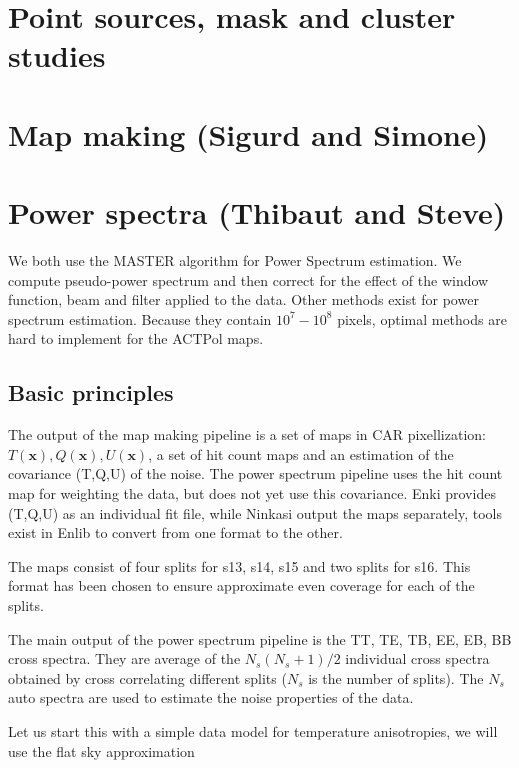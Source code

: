 \documentclass[a4paper, 11pt]{article}
\begin{document}
\section{Point sources, mask and cluster studies}


\section{Map making (Sigurd and Simone)}

\section{Power spectra (Thibaut and Steve)}

We both use the MASTER algorithm for Power Spectrum estimation. We compute pseudo-power spectrum and then correct for the effect of the window function, beam and filter applied to the data. Other methods exist for power spectrum estimation. Because they contain $10^{7}-10^{8}$ pixels, optimal methods are hard to implement for the ACTPol maps.

\subsection{Basic principles}\label{subsec:PSbasis}

The output of the map making pipeline is a set of maps in CAR pixellization: $T(\bm{x}), Q(\bm{x}), U(\bm{x})$, a set of hit count maps and an estimation of the covariance (T,Q,U) of the noise. The power spectrum pipeline uses the hit count map for weighting the data, but  does not yet use this covariance.
Enki provides (T,Q,U) as an individual fit file, while Ninkasi output the maps separately, tools exist in Enlib to convert from one format to the other. 

The maps consist of four splits for s13, s14, s15 and two splits for s16. This format has been chosen to ensure  approximate even coverage for each of the splits. 

The main output of the power spectrum pipeline is  the TT, TE, TB, EE, EB, BB cross spectra. They are average of the $N_{s}(N_{s}+1)/2$ individual cross spectra obtained by cross correlating different splits  ($N_{s}$ is the number of splits). The $N_{s}$ auto spectra are  used to estimate the noise properties of the data. 

Let us start this with a simple data model for temperature anisotropies, we will use the flat sky approximation
\end{document}

